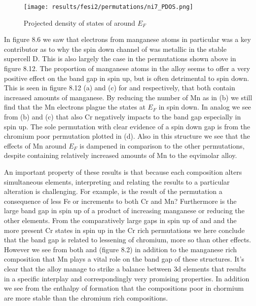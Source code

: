 \begin{figure}[H]
	\centering
	\texttt{[image: results/fesi2/permutations/ni7\_PDOS.png]}
	\caption{Projected density of states of  around $E_F$}
\end{figure}

In figure 8.6 we saw that electrons from manganese atoms in particular was a key contributor as to why the spin down channel of  was metallic in the stable supercell D. This is also largely the case in the permutations shown above in figure 8.12. The proportion of manganese atoms in the alloy seems to offer a very positive effect on the band gap in spin up, but is often detrimental to spin down. This is seen in figure 8.12 (a) and (c) for  and  respectively, that both contain increased amounts of manganese. By reducing the number of Mn as in (b) we still find that the Mn electrons plague the states at $E_F$ in spin down. In analog we see from (b) and (c) that also Cr negatively impacts to the band gap especially in spin up. The sole permutation with clear evidence of a spin down gap is from the chromium poor permutation plotted in (d). Also in this structure we see that the effects of Mn around $E_F$ is dampened in comparison to the other permutations, despite containing relatively increased amounts of Mn to the eqvimolar alloy.  

An important property of these results is that because each composition alters simultaneous elements, interpreting and relating the results to a particular alteration is challenging. For example, is the result of the  permutation a consequence of less Fe or increments to both Cr and Mn? Furthermore is the large band gap in spin up of  a product of increasing manganese or reducing the other elements. From the comparatively large gaps in spin up of  and  and the more present Cr states in spin up in the Cr rich permutations we here conclude that the band gap is related to lessening of chromium, more so than other effects. However we see from both  and  (figure 8.2) in addition to the manganese rich composition that Mn plays a vital role on the band gap of these structures. It's clear that the  alloy manage to strike a balance between 3d elements that results in a specific interplay and correspondingly very promising properties. In addition we see from the enthalpy of formation that the compositions poor in chormium are more stable than the chromium rich compositions. 

